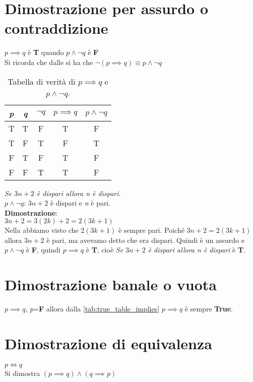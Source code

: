 \section{Dimostrazione per assurdo o contraddizione}
$p \implies q$ è \textbf{T} quando $p \wedge \neg q$ è \textbf{F} \\
Si ricorda che dalle  si ha che $\neg (p \implies q) \equiv p \wedge \neg q$
\begin{table}[H]
    \centering    
    \caption{\label{tab:true_table_p_imp_q__p_and_not_q}Tabella di verità di $p \implies q$ e $p \wedge \neg q$.}
    \begin{tabular}{|c | c | c | c || c ||} 
     \hline
     \textit{p} & \textit{q} & $\neg q$ & $p \implies q$ & $p \wedge \neg q$ \\
     \hline\hline
     T & T & F & T & F \\ 
     \hline
     T & F & T & F & T \\
     \hline
     F & T & F & T & F \\
     \hline
     F & F & T & T & F \\
     \hline
    \end{tabular}
\end{table}
\begin{example}
\emph{Se $3n+2$ è dispari allora \textit{n} è dispari}. \\
\textbf{$p \wedge \neg q$}: $3n+2$ è dispari e \textit{n} è pari. \\
\textbf{Dimostrazione}: \\
$3n+2=3(2k)+2=2(3k+1)$ \\
Nella  abbiamo visto che $2(3k+1)$ è sempre pari. Poiché $3n+2=2(3k+1)$ allora $3n+2$ è pari, ma avevamo detto che era dispari. Quindi è un assurdo e \textbf{$p \wedge \neg q$} è \textbf{F}, quindi $p \implies q$ è \textbf{T}, cioè \emph{Se $3n+2$ è dispari allora \textit{n} è dispari} è \textbf{T}.
\end{example}

\section{Dimostrazione banale o vuota}
$p \implies q$, \textit{p}=\textbf{F} allora dalla \autoref{tab:true_table_implies} $p \implies q$ è sempre \textbf{True}.

\section{Dimostrazione di equivalenza}
$p \iff q$ \\
Si dimostra $(p \implies q) \wedge (q \implies p)$


